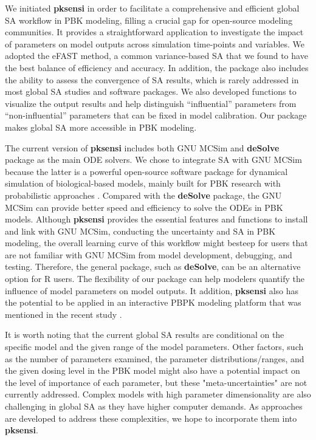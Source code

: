 \documentclass[preprint,12pt, a4paper]{elsarticle}
\begin{document}
We initiated \textbf{pksensi} in order to facilitate a comprehensive and efficient global SA workflow in PBK modeling, filling a crucial gap for open-source modeling communities. It provides a straightforward
application to investigate the impact of parameters on model outputs across simulation time-points and variables. We adopted the eFAST method, a common variance-based SA that we found to have the best
balance of efficiency and accuracy. In addition, the package also includes the ability to assess the convergence of SA results, which is rarely addressed in most global SA studies and software packages. We also developed functions to visualize the output results and help distinguish  ``influential'' parameters from ``non-influential'' parameters that can be fixed in model calibration. Our package makes global SA more accessible in PBK modeling.

The current version of \textbf{pksensi} includes both GNU MCSim and \textbf{deSolve} package as the main ODE solvers.  We chose to integrate SA with GNU MCSim because the latter is a powerful open-source software package for dynamical simulation of biological-based models, mainly built for PBK research with probabilistic approaches \cite{bois2009gnu}.  Compared with the \textbf{deSolve} package, the GNU MCSim can provide better speed and efficiency to solve the ODEs in PBK models. Although \textbf{pksensi} provides the essential features and functions to install and link with GNU MCSim, conducting the uncertainty and SA in PBK modeling, the overall learning curve of this workflow might besteep for users that are not familiar with GNU MCSim from model development, debugging, and testing. Therefore, the general package, such as \textbf{deSolve}, can be an alternative option for R users. The flexibility of our package can help modelers quantify the influence of model parameters on model outputs. It addition, \textbf{pksensi} also has the potential to be applied in an interactive PBPK modeling platform that was mentioned in the recent study \cite{li2019integration}.

It is worth noting that the current global SA results are conditional on the specific model and the given range of the model parameters. Other factors, such as the number of parameters examined, the parameter distributions/ranges, and the given dosing level in the PBK model might also have a potential impact on the level of importance of each parameter, but these "meta-uncertainties" are not currently addressed. Complex models with high parameter dimensionality are also challenging in global SA as they have higher computer demands. As approaches are developed to address these complexities, we hope to incorporate them into \textbf{pksensi}.
\end{document}
